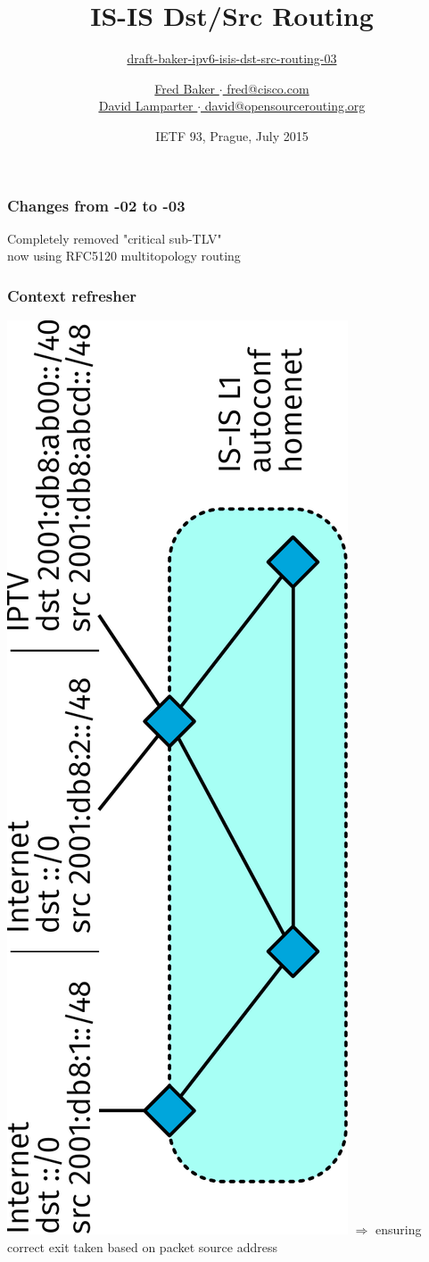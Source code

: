 \documentclass[12pt]{beamer}
\title{IS-IS Dst/Src Routing}
\subtitle{%
  \href{https://datatracker.ietf.org/doc/draft-baker-ipv6-isis-dst-src-routing/}{draft-baker-ipv6-isis-dst-src-routing-03}
}
\author{%
\href{mailto:fred@cisco.com}{Fred Baker $\cdot$ fred@cisco.com}\\%
\underline{\href{mailto:david@opensourcerouting.org}{David Lamparter $\cdot$ david@opensourcerouting.org}}%
}
\date{IETF 93, Prague, July 2015}
\begin{document}
\begin{frame}
  \titlepage
\end{frame}

\begin{frame}
  \frametitle{Changes from -02 to -03}
  {\Large Completely removed "critical sub-TLV"\\[12pt]
  now using RFC5120 multitopology routing}
\end{frame}

\begin{frame}
  \frametitle{Context refresher}
  \includegraphics[scale=0.45,angle=-90]{intro_topo.pdf}%
  \vspace{5mm}
  $\Rightarrow$ ensuring correct exit taken based on packet source address
\end{frame}
\end{document}
